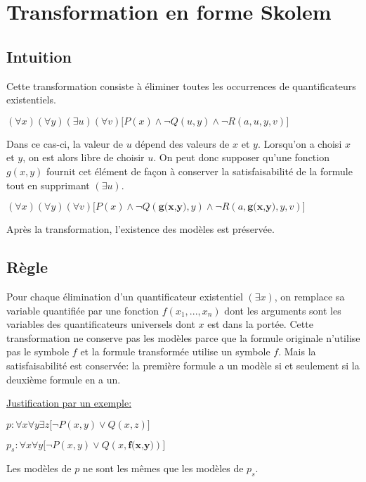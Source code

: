 {%

\section{Transformation en forme Skolem}
\subsection{Intuition}

Cette transformation consiste à éliminer toutes les occurrences de quantificateurs existentiels.
\smallskip

$(\forall x)(\forall y)(\exists u)(\forall v) \big[ P(x) \wedge \neg Q(u,y) \wedge \neg R(a,u,y,v) \big]$
\smallskip 


Dans ce cas-ci, la valeur de $u$ dépend des valeurs de $x$ et $y$. Lorsqu'on a choisi $x$ et $y$, on est alors libre de choisir $u$.
On peut donc supposer qu'une fonction $g(x,y)$ fournit cet élément de façon à conserver la satisfaisabilité de la formule tout en supprimant $(\exists u)$.
\smallskip

$(\forall x)(\forall y)(\forall v) \big[ P(x) \wedge \neg Q(\textbf{g(x,y)},y) \wedge \neg R(a,\textbf{g(x,y)},y,v) \big]$
\smallskip

Après la transformation, l'existence des modèles est préservée.

\subsection{Règle}

Pour chaque élimination d'un quantificateur existentiel $(\exists x)$, on remplace sa variable quantifiée par une fonction $f(x_1,...,x_n)$ dont les arguments sont les variables des quantificateurs universels dont $x$ est dans la portée.
Cette transformation ne conserve pas les modèles parce que la formule originale n'utilise pas le symbole $f$
et la formule transformée utilise un symbole $f$.
Mais la satisfaisabilité est conservée: la première formule a un modèle si et seulement si la deuxième formule en a un.
\smallskip

\underline{Justification par un exemple:}

$p: \forall x \forall y \exists z \big[ \neg P(x,y) \vee Q(x,z) \big]$
\smallskip

$p_s: \forall x \forall y \big[ \neg P(x,y) \vee Q(x,\textbf{f(x,y)}) \big]$
\smallskip

Les modèles de $p$ ne sont les mêmes que les modèles de $p_s$.

}
